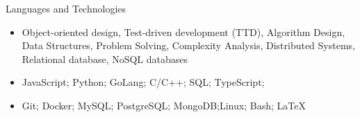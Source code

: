 \documentclass[]{cv}
\begin{document}
	\begin{cvsection}{Languages and Technologies}
					\vspace{2mm}

		\begin{cvsubsection}{}{}{}	
			\begin{itemize}
				\item Object-oriented design, Test-driven development (TTD), Algorithm Design, Data Structures, Problem Solving, Complexity Analysis, Distributed Systems, Relational database, NoSQL databases
				\item JavaScript; Python; GoLang; C/C++; SQL; TypeScript; 
				\item Git; Docker; MySQL; PostgreSQL; MongoDB;Linux; Bash; LaTeX
			\end{itemize}
		\end{cvsubsection}
	\end{cvsection}
	
\end{document}
